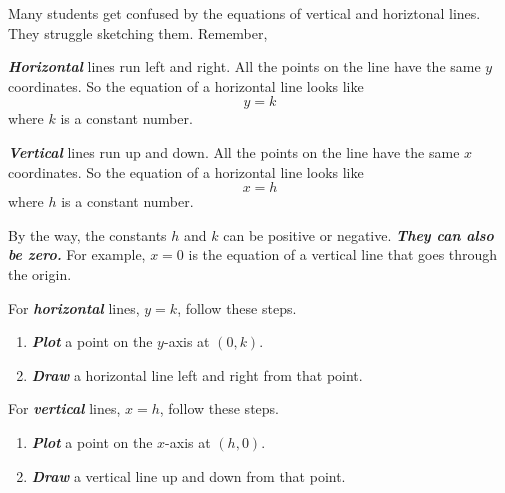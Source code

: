 \documentclass[fleqn,letterpaper,12pt,printwatermark=false]{memoir}
\begin{document}
\begin{myLesson}[][3]
    Many students get confused by the equations of vertical and horiztonal lines.
    They struggle sketching them.
    Remember,
    \begin{myLessonBox}
        {\bfseries\itshape Horizontal} lines run left and right.
        All the points on the line have the same $y$ coordinates.
        So the equation of a horizontal line looks like
        \[ y = k \]
        where $k$ is a constant number.
    \end{myLessonBox}
    \begin{myLessonBox}
        {\bfseries\itshape Vertical} lines run up and down.
        All the points on the line have the same $x$ coordinates.
        So the equation of a horizontal line looks like
        \[ x = h \]
        where $h$ is a constant number.
    \end{myLessonBox}
\end{myLesson}

By the way, the constants $h$ and $k$ can be positive or negative.
{\bfseries\itshape They can also be zero.}
For example, $x=0$ is the equation of a vertical line that goes through the origin.

\begin{myKeyConcepts}
    For {\bfseries\itshape horizontal} lines, $y=k$, follow these steps.
    \begin{enumerate}
        \item {\bfseries\itshape Plot} a point on the $y$-axis at $(0,k)$.
        \item {\bfseries\itshape Draw} a horizontal line left and right from that point.
    \end{enumerate}
    \vspace{1em}
    For {\bfseries\itshape vertical} lines, $x=h$, follow these steps.
    \begin{enumerate}
        \item {\bfseries\itshape Plot} a point on the $x$-axis at $(h,0)$.
        \item {\bfseries\itshape Draw} a vertical line up and down from that point.
    \end{enumerate}
\end{myKeyConcepts}





  
\end{document}
